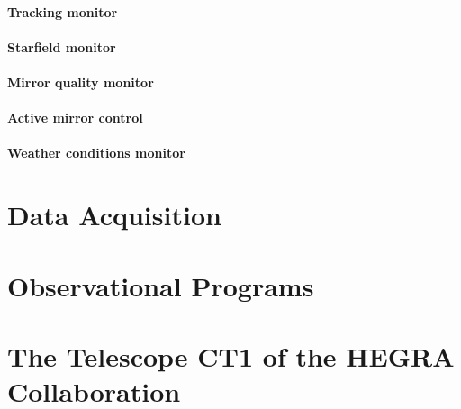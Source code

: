 \paragraph{Tracking monitor}

\paragraph{Starfield monitor}

\paragraph{Mirror quality monitor}

\paragraph{Active mirror control}

\paragraph{Weather conditions monitor}

\section{Data Acquisition}

\section{Observational Programs}

\section{The Telescope CT1 of the HEGRA Collaboration}

\endinput
%

